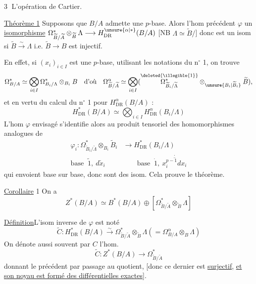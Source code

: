 \textcircled{3} L'opération de Cartier.

\uline{Théorème 1} Supposons que $B/A$ admette une $p$-base. Alors l'hom précédent $\varphi$  un \uline{isomorphisme} $\Omega^*_{\widetilde B/\widetilde A}\otimes_{\widetilde B}\Lambda\longrightarrow H^{\unsure{\alpha|*}}_{\mathrm{DR}}(B/A)$ [NB $\Lambda\simeq\widetilde B/$] donc est un isom si $\widetilde B\xrightarrow{\sim}\Lambda$ i.e. $\widetilde B\longrightarrow B$ est injectif.

En effet, si $(x_i)_{i\in I}$ est une $p$-base, utilisant les notations du n$^\circ$ 1, on trouve 
\[
 \Omega^*_{B/A}\simeq\bigotimes_{i\in I}\Omega^*_{B_i/\Lambda}\otimes_{B_i}B
 \quad\text{d'où}\quad
 \Omega^\alpha_{\widetilde B/\widetilde A}\simeq\bigotimes_{i\in I}
 (\overset{\deleted{\illegible{1}}}{\Omega^*_{\widetilde B_i/\widetilde\Lambda}}\otimes_{\unsure{B_i|\widetilde B_i}}\widetilde B),
\]
et en vertu du calcul du n$^\circ$ 1 pour $H^\alpha_{\mathrm{DR}}(B/A)$ :
\[
 H^*_{\mathrm{DR}}(B/A)\simeq\bigotimes_{i\in I}H^\alpha_{\mathrm{DR}}(B_i/\Lambda)
\]
L'hom $\varphi$ envisagé s'identifie alors au produit tensoriel des homomorphismes analogues  de
\[
 \begin{aligned}
 \varphi_i:\Omega^*_{\widetilde B_i/\widetilde\Lambda}\otimes_{B_i}\widetilde B_i
 &\longrightarrow H^*_{\mathrm{DR}}(B_i/\Lambda)\\
 \text{base }\ \widetilde 1,\ d\widetilde x_i&\qquad
 \text{base }\ \dot{1},\ \overset{\cdot}{\overline{x_i^{p-1}dx_i}}
 \end{aligned}
\]
qui envoient base sur base, donc sont des isom. Cela prouve le théorème.

\uline{Corollaire} 1  On a
\[
 Z^*(B/A)\simeq B^*(B/A)\oplus[\Omega^*_{\widetilde B/\widetilde A}\otimes_{\widetilde B}\Lambda]
\]

\uline{Définition}\quad L'isom inverse de $\varphi$ est noté
\[
 \boxed{\widetilde C:H^*_{\mathrm{DR}}(B/A)\xrightarrow{\sim}
 \Omega^*_{\widetilde B/\widetilde A}\otimes_{\widetilde B}\Lambda}
 \boxed{(=\Omega^\alpha_{B/A}\otimes_B\Lambda)}
\]
On dénote aussi souvent par $C$ l'hom.
\[
 \widetilde C:Z^*(B/A)\longrightarrow\Omega^*_{\widetilde B/\widetilde A}
\]
donnant le précédent par passage au quotient, [donc ce dernier est \uline{surjectif}, \uline{et son noyau est formé des différentielles exactes}].

